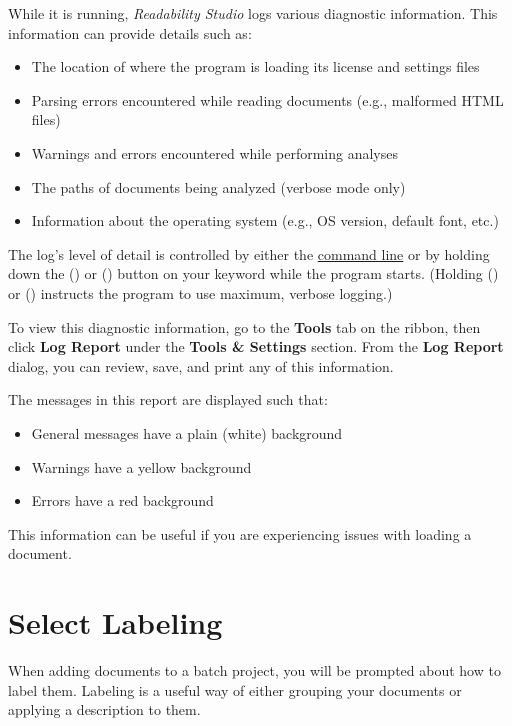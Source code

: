 \documentclass[
]{book}
\providecommand{\tightlist}{%
  \setlength{\itemsep}{0pt}\setlength{\parskip}{0pt}}
\theoremstyle{definition}
\theoremstyle{definition}
\theoremstyle{definition}
\theoremstyle{definition}
\theoremstyle{remark}
\begin{document}
While it is running, \emph{Readability Studio} logs various diagnostic information. This information can provide details such as:

\begin{itemize}
\tightlist
\item
  The location of where the program is loading its license and settings files
\item
  Parsing errors encountered while reading documents (e.g., malformed HTML files)
\item
  Warnings and errors encountered while performing analyses
\item
  The paths of documents being analyzed (verbose mode only)
\item
  Information about the operating system (e.g., OS version, default font, etc.)
\end{itemize}

The log's level of detail is controlled by either the \protect\hyperlink{command-line-options}{command line} or by holding down the  (\faWindows) or \keys{\shift} (\faApple) button on your keyword while the program starts. (Holding  (\faWindows) or \keys{\shift} (\faApple) instructs the program to use maximum, verbose logging.)

To view this diagnostic information, go to the \textbf{Tools} tab on the ribbon, then click \textbf{Log Report} under the \textbf{Tools \& Settings} section. From the \textbf{Log Report} dialog, you can review, save, and print any of this information.

The messages in this report are displayed such that:

\begin{itemize}
\tightlist
\item
  General messages have a plain (white) background
\item
  Warnings have a yellow background
\item
  Errors have a red background
\end{itemize}

This information can be useful if you are experiencing issues with loading a document.

\hypertarget{select-labeling}{%
\section{Select Labeling}\label{select-labeling}}

When adding documents to a batch project, you will be prompted about how to label them. Labeling is a useful way of either grouping your documents or applying a description to them.
\end{document}

